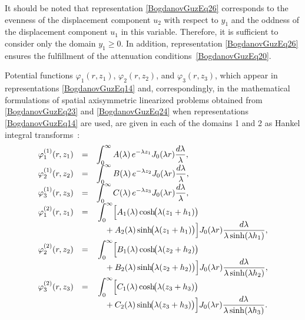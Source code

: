 It should be noted that representation \eqref{BogdanovGuzEq26} corresponds to the evenness of the displacement component $u_{2}$ with respect to $y_{1}$ and the oddness of the displacement component $u_{1}$ in this variable. Therefore, it is sufficient to consider only the domain $y_{1}\ge 0$. In addition, representation \eqref{BogdanovGuzEq26} ensures the fulfillment of the attenuation conditions~\eqref{BogdanovGuzEq20}.

Potential functions $\varphi_{1}(r,z_{1})$, $\varphi_{2}(r,z_{2})$, and $\varphi_{3}(r,z_{3})$, which appear in representations \eqref{BogdanovGuzEq14} and, correspondingly, in the mathematical formulations of spatial axisymmetric linearized problems obtained from \eqref{BogdanovGuzEq23} and \eqref{BogdanovGuzEq24} when representations \eqref{BogdanovGuzEq14} are used, are given in each of the domains 1 and 2 as Hankel integral transforms~\cite{BogdanovGuz62}:
\begin{equation}
	\label{BogdanovGuzEq27}
	\begin{array}{rcl}
		\varphi_{1}^{(1)}(r,z_{1})&=&\displaystyle
		\int_{0}^{\infty}
		A(\lambda)\,
		e^{-\lambda z_{1}}
		J_{0}(\lambda r)
		\frac{d\lambda}{\lambda},
		\\
		\varphi_{2}^{(1)}(r,z_{2})&=&\displaystyle
		\int_{0}^{\infty}
		B(\lambda)\,
		e^{-\lambda z_{2}}
		J_{0}(\lambda r)
		\frac{d\lambda}{\lambda},
		\\
		\varphi_{3}^{(1)}(r,z_{3})&=&\displaystyle
		\int_{0}^{\infty}
		C(\lambda)\,
		e^{-\lambda z_{3}}
		J_{0}(\lambda r)
		\frac{d\lambda}{\lambda},
		\\
		\varphi_{1}^{(2)}(r,z_{1})
		&=&
		\begin{multlined}[t]
			\displaystyle
			\int_{0}^{\infty}
			\Bigl[
			A_{1}(\lambda)\cosh\!\bigl(\lambda(z_{1}+h_{1})\bigr) \\
			\\[-3em]
			+ A_{2}(\lambda)\sinh\!\bigl(\lambda(z_{1}+h_{1})\bigr)
			\Bigr]
			J_{0}(\lambda r)
			\frac{d\lambda}{\lambda\sinh(\lambda h_{1})},
		\end{multlined}
		\\
		\varphi_{2}^{(2)}(r,z_{2})
		&=&
		\begin{multlined}[t]
			\displaystyle
			\int_{0}^{\infty}
			\Bigl[
			B_{1}(\lambda)\cosh\!\bigl(\lambda(z_{2}+h_{2})\bigr) \\
			\\[-3em]
			+ B_{2}(\lambda)\sinh\!\bigl(\lambda(z_{2}+h_{2})\bigr)
			\Bigr]
			J_{0}(\lambda r)
			\frac{d\lambda}{\lambda\sinh(\lambda h_{2})},
		\end{multlined}
		\\
		\varphi_{3}^{(2)}(r,z_{3})
		&=&
		\begin{multlined}[t]
			\displaystyle
			\int_{0}^{\infty}
			\Bigl[
			C_{1}(\lambda)\cosh\!\bigl(\lambda(z_{3}+h_{3})\bigr) \\
			\\[-3em]
			+ C_{2}(\lambda)\sinh\!\bigl(\lambda(z_{3}+h_{3})\bigr)
			\Bigr]
			J_{0}(\lambda r)
			\frac{d\lambda}{\lambda\sinh(\lambda h_{3})}.
		\end{multlined}
	\end{array}
\end{equation}
